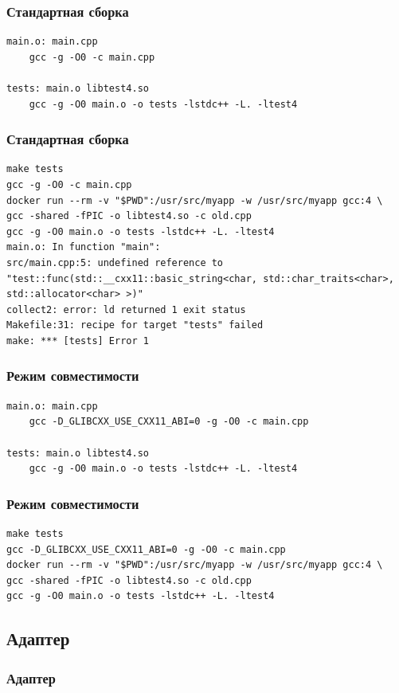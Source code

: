 \documentclass{beamer}
\begin{document}
\begin{frame}[fragile]
\frametitle{Стандартная сборка}
\begin{verbatim}
main.o: main.cpp
	gcc -g -O0 -c main.cpp 

tests: main.o libtest4.so
	gcc -g -O0 main.o -o tests -lstdc++ -L. -ltest4
\end{verbatim}
\end{frame}

\begin{frame}[fragile]
\frametitle{Стандартная сборка}
\begin{verbatim}
make tests
gcc -g -O0 -c main.cpp 
docker run --rm -v "$PWD":/usr/src/myapp -w /usr/src/myapp gcc:4 \
gcc -shared -fPIC -o libtest4.so -c old.cpp
gcc -g -O0 main.o -o tests -lstdc++ -L. -ltest4
main.o: In function "main":
src/main.cpp:5: undefined reference to 
"test::func(std::__cxx11::basic_string<char, std::char_traits<char>, 
std::allocator<char> >)"
collect2: error: ld returned 1 exit status
Makefile:31: recipe for target "tests" failed
make: *** [tests] Error 1
\end{verbatim}
\end{frame}

\begin{frame}[fragile]
\frametitle{Режим совместимости}
\begin{verbatim}
main.o: main.cpp
	gcc -D_GLIBCXX_USE_CXX11_ABI=0 -g -O0 -c main.cpp

tests: main.o libtest4.so
	gcc -g -O0 main.o -o tests -lstdc++ -L. -ltest4
\end{verbatim}
\end{frame}

\begin{frame}[fragile]
\frametitle{Режим совместимости}
\begin{verbatim}
make tests
gcc -D_GLIBCXX_USE_CXX11_ABI=0 -g -O0 -c main.cpp 
docker run --rm -v "$PWD":/usr/src/myapp -w /usr/src/myapp gcc:4 \
gcc -shared -fPIC -o libtest4.so -c old.cpp
gcc -g -O0 main.o -o tests -lstdc++ -L. -ltest4
\end{verbatim}
\end{frame}

\subsection{Адаптер}
\begin{frame}[fragile]
\frametitle{Адаптер}
\inputminted{c++}{../src/adapter.h}
\end{frame}
\end{document}

